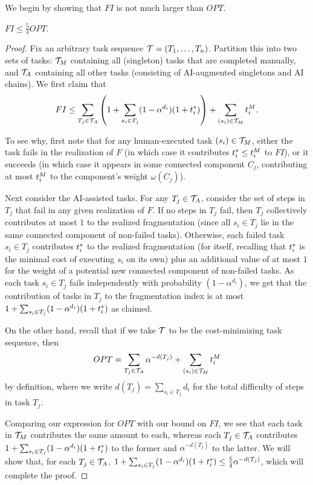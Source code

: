 We begin by showing that $FI$ is not much larger than $OPT$.

\begin{proposition}
\label{prop:FI.upper.bound}
    $FI \leq \tfrac{5}{4}OPT$.
\end{proposition}
\begin{proof}
Fix an arbitrary task sequence $\mathcal{T} = (T_1, \dotsc, T_n)$.  
Partition this into two sets of tasks: $\mathcal{T}_{M}$ containing all (singleton) tasks that are completed manually, and $\mathcal{T}_{A}$ containing all other tasks (consisting of AI-augmented singletons and AI chains).  
We first claim that 
\[ FI \leq \sum_{T_j \in \mathcal{T}_{A}}\left(1 + \sum_{s_i \in T_j}(1-\alpha^{d_i})(1+t^*_{i})\right) + \sum_{(s_i) \in \mathcal{T}_{M}}t^{M}_{i}. \]

To see why, first note that for any human-executed task $(s_i) \in \mathcal{T}_{M}$, either the task fails in the realization of $F$ (in which case it contributes $t^*_{i} \leq t^{M}_{i}$ to $FI$), or it succeeds (in which case it appears in some connected component $C_j$, contributing at most $t^{M}_{i}$ to the component's weight $\omega(C_j)$).

Next consider the AI-assisted tasks.  
For any $T_j \in \mathcal{T}_{A}$, consider the set of steps in $T_j$ that fail in any given realization of $F$. 
If no steps in $T_j$ fail, then $T_j$ collectively contributes at most $1$ to the realized fragmentation (since all $s_i \in T_j$ lie in the same connected component of non-failed tasks).  
Otherwise, each failed task $s_i \in T_j$ contributes $t^*_{i}$ to the realized fragmentation (for itself, recalling that $t^*_{i}$ is the minimal cost of executing $s_i$ on its own) plus an additional value of at most $1$ for the weight of a potential new connected component of non-failed tasks.  
As each task $s_i \in T_j$ fails independently with probability $(1-\alpha^{d_i})$, we get that the contribution of tasks in $T_j$ to the fragmentation index is at most $1 + \sum_{s_i \in T_j}(1-\alpha^{d_i})(1+t^*_{i})$ as claimed.

On the other hand, recall that if we take $\mathcal{T}$ to be the cost-minimizing task sequence, then
\[ OPT = \sum_{T_j \in \mathcal{T}_{A}} \alpha^{-d(T_j)} + \sum_{(s_i) \in \mathcal{T}_{M}} t^{M}_{i} \] 
by definition, where we write $d(T_j) = \sum_{s_i \in T_j}d_i$ for the total difficulty of steps in task $T_j$.

Comparing our expression for $OPT$ with our bound on $FI$, we see that each task in $\mathcal{T}_{M}$ contributes the same amount to each, whereas each $T_j \in \mathcal{T}_{A}$ contributes $1+\sum_{s_i \in T_j}(1-\alpha^{d_i})(1+t^*_{i})$ to the former and $\alpha^{-d(T_j)}$ to the latter.  
We will show that, for each $T_j \in \mathcal{T}_{A}$, $1 + \sum_{s_i \in T_j}(1-\alpha^{d_i})(1+t^*_{i}) \leq \frac{5}{4} \alpha^{-d(T_j)}$, which will complete the proof.


\end{proof}
